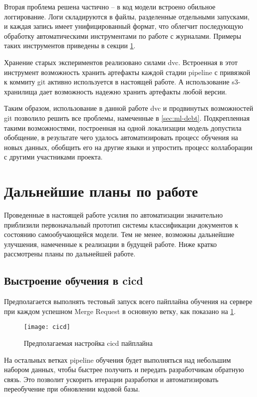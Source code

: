 Вторая проблема решена частично -- в код модели встроено обильное логгирование.
Логи складируются в файлы, разделенные отдельными запусками, и каждая запись имеет унифицированный формат, что облегчит последующую обработку автоматическими инструментами по работе с журналами.
Примеры таких инструментов приведены в секции \ref{sec:future}.

Хранение старых экспериментов реализовано силами \gls{dvc}.
Встроенная в этот инструмент возможность хранить артефакты каждой стадии \gls{pipeline} с привязкой к коммиту \gls{git} активно используется в настоящей работе.
А использование \gls{s3}-хранилища дает возможность надежно хранить артефакты любой версии.

Таким образом, использование в данной работе \gls{dvc} и продвинутых возможностей \gls{git} позволило решить все проблемы, намеченные в \ref{sec:ml-debt}.
Подкрепленная такими возможностями, построенная на одной локализации модель допустила обобщение, в результате чего удалось автоматизировать процесс обучения на новых данных, обобщить его на другие языки и упростить процесс коллаборации с другими участниками проекта.
\section{Дальнейшие планы по работе}
\label{sec:future}
Проведенные в настоящей работе усилия по автоматизации значительно приблизили первоначальный прототип системы классификации документов к состоянию самообучающейся модели.
Тем не менее, возможны дальнейшие улучшения, намеченные к реализации в будущей работе.
Ниже кратко рассмотрены планы по дальнейшей работе.
    \subsection{Выстроение обучения в \gls{cicd}}
    Предполагается выполнять тестовый запуск всего пайплайна обучения на сервере при каждом успешном Merge Request в основную ветку, как показано на \ref{fig:cicd}.
    \begin{figure}[h]
        \centering
        \texttt{[image: cicd]}
        \caption{Предполагаемая настройка \gls{cicd} пайплайна}
        \label{fig:cicd}
    \end{figure}
    На остальных ветках \gls{pipeline} обучения будет выполняться над небольшим набором данных, чтобы быстрее получить и передать разработчикам обратную связь.
    Это позволит ускорить итерации разработки и автоматизировать переобучение при обновлении кодовой базы.

